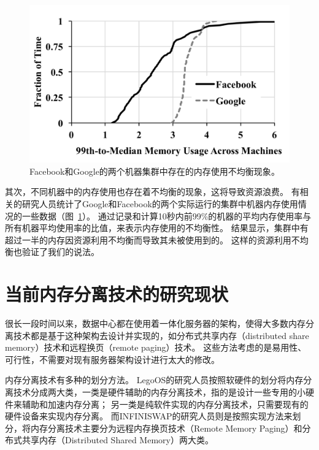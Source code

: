 \begin{figure}
\centering
\includegraphics[scale=0.6]{Figures/memory/memory_motivation2.png}
\decoRule
\caption{Facebook和Google的两个机器集群中存在的内存使用不均衡现象\cite{gu2017efficient}。}
\label{fig:memory_motivation2}
\end{figure}

其次，不同机器中的内存使用也存在着不均衡的现象，这将导致资源浪费。
有相关的研究人员统计了Google和Facebook的两个实际运行的集群中机器内存使用情况的一些数据（图~\ref{fig:memory_motivation2}）。
通过记录和计算10秒内前99\%的机器的平均内存使用率与所有机器平均使用率的比值，来表示内存使用的不均衡性。
结果显示，集群中有超过一半的内存因资源利用不均衡而导致其未被使用到的。
这样的资源利用不均衡也验证了我们的说法。



\section{当前内存分离技术的研究现状}

很长一段时间以来，数据中心都在使用着一体化服务器的架构，使得大多数内存分离技术都是基于这种架构去设计并实现的，如分布式共享内存（distributed share memory）技术和远程换页（remote paging）技术。
这些方法考虑的是易用性、可行性，不需要对现有服务器架构设计进行太大的修改。

内存分离技术有多种的划分方法。
LegoOS\cite{shan2018legoos}的研究人员按照软硬件的划分将内存分离技术分成两大类，一类是硬件辅助的内存分离技术，指的是设计一些专用的小硬件来辅助和加速内存分离；
另一类是纯软件实现的内存分离技术，只需要现有的硬件设备来实现内存分离。
而INFINISWAP的研究人员则是按照实现方法来划分，将内存分离技术主要分为远程内存换页技术（Remote Memory Paging）和分布式共享内存（Distributed Shared Memory）两大类。

